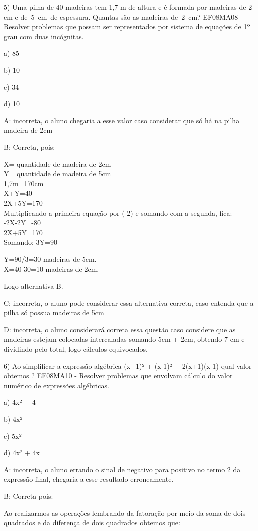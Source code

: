 5) Uma pilha de 40 madeiras tem 1,7 m de altura e é formada por madeiras
de 2 cm e de~5~cm~de espessura. Quantas são as madeiras de~2~cm?
EF08MA08 - Resolver problemas que possam ser representados por sistema
de equações de 1º grau com duas incógnitas.

a) 85

b) 10

c) 34

d) 10

A: incorreta, o aluno chegaria a esse valor caso considerar que só há na
pilha madeira de 2cm

B: Correta, pois:

X= quantidade de madeira de 2cm\\
Y= quantidade de madeira de 5cm\\
1,7m=170cm\\
X+Y=40\\
2X+5Y=170\\
Multiplicando a primeira equação por (-2) e somando com a segunda,
fica:\\
-2X-2Y=-80\\
2X+5Y=170\\
Somando: 3Y=90

Y=90/3=30 madeiras de 5cm.\\
X=40-30=10 madeiras de 2cm.

Logo alternativa B.

C: incorreta, o aluno pode considerar essa alternativa correta, caso
entenda que a pilha só possua madeiras de 5cm

D: incorreta, o aluno considerará correta essa questão caso considere
que as madeiras estejam colocadas intercaladas somando 5cm + 2cm,
obtendo 7 cm e dividindo pelo total, logo cálculos equivocados.

6) Ao simplificar a expressão algébrica (x+1)² + (x-1)² + 2(x+1)(x-1)
qual valor obtemos ? EF08MA10 - Resolver problemas que envolvam cálculo
do valor numérico de expressões algébricas.

a) 4x² + 4

b) 4x²

c) 5x²

d) 4x² + 4x

A: incorreta, o aluno errando o sinal de negativo para positivo no termo
2 da expressão final, chegaria a esse resultado erroneamente.

B: Correta pois:

Ao realizarmos as operações lembrando da fatoração por meio da soma de
dois quadrados e da diferença de dois quadrados obtemos que:

